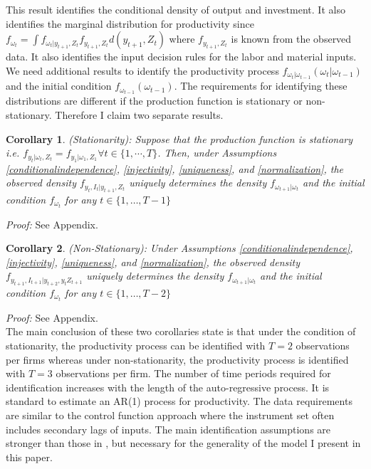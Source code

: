 \documentclass{article}
\newtheorem{corollary}{Corollary}[section]
\begin{document}
This result identifies the conditional density of output and investment. It also identifies the marginal distribution for productivity since $f_{\omega_{t}}=\int f_{\omega_{t}|y_{t+1}, Z_{t}}f_{y_{t+1},Z_{t}}d(y_{t+1},Z_{t})$ where $f_{y_{t+1},Z_{t}}$ is known from the observed data. It also identifies the input decision rules for the labor and material inputs. We need additional results to identify the productivity process $f_{\omega_{t}|\omega_{t-1}}(\omega_{t}|\omega_{t-1})$ and the initial condition $f_{\omega_{t-1}}(\omega_{t-1})$. The requirements for identifying these distributions are different if the production function is stationary or non-stationary. Therefore I claim two separate results.

\begin{corollary} \label{stationary} (Stationarity): Suppose that the production function is stationary i.e. $f_{y_{t}|\omega_{t}, Z_{t}}=f_{y_{1}|\omega_{1}, Z_{1}} \forall t\in\{1,\cdots,T\}$. Then, under Assumptions \ref{conditionalindependence}, \ref{injectivity}, \ref{uniqueness}, and \ref{normalization}, the observed density $f_{y_{t}, I_{t}|y_{t+1}, Z_{t}}$ uniquely determines the density $f_{\omega_{t+1}|\omega_{t}}$ and the initial condition $f_{\omega_{t}}$ for any $t\in\{1,\dots,T-1\}$
\end{corollary}
\textit{Proof:} See Appendix.\\
\begin{corollary} \label{stationary} (Non-Stationary): Under Assumptions \ref{conditionalindependence}, \ref{injectivity}, \ref{uniqueness}, and \ref{normalization}, the observed density $f_{y_{t+1}, I_{t+1}|y_{t+2}, y_{t} Z_{t+1}}$ uniquely determines the density $f_{\omega_{t+1}|\omega_{t}}$ and the initial condition $f_{\omega_{t}}$ for any $t\in\{1,\dots,T-2\}$
\end{corollary}
\textit{Proof:} See Appendix.\\

The main conclusion of these two corollaries state is that under the condition of stationarity, the productivity process can be identified with $T=2$ observations per firms whereas under non-stationarity, the productivity process is identified with $T=3$ observations per firm. The number of time periods required for identification increases with the length of the auto-regressive process. It is standard to estimate an AR(1) process for productivity. The data requirements are similar to the control function approach where the instrument set often includes secondary lags of inputs. The main identification assumptions are stronger than those in \cite{Hu2019}, but necessary for the generality of the model I present in this paper.
\end{document}
